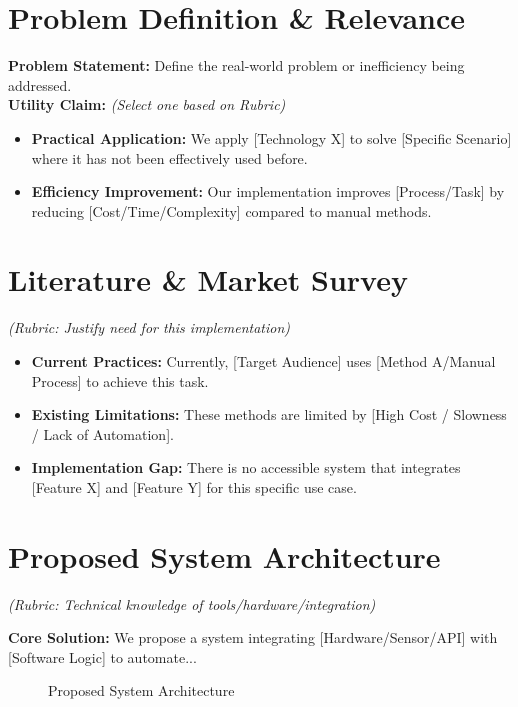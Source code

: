 \documentclass[11pt, a4paper]{article}
\begin{document}

\section{Problem Definition \& Relevance}
\textbf{Problem Statement:} Define the real-world problem or inefficiency being addressed. \\
\textbf{Utility Claim:} \textit{(Select one based on Rubric)}
\begin{itemize}[noitemsep, topsep=0pt]
    \item \textbf{Practical Application:} We apply [Technology X] to solve [Specific Scenario] where it has not been effectively used before.
    \item \textbf{Efficiency Improvement:} Our implementation improves [Process/Task] by reducing [Cost/Time/Complexity] compared to manual methods.
\end{itemize}

\section{Literature \& Market Survey}
\textit{(Rubric: Justify need for this implementation)}
\begin{itemize}[noitemsep, topsep=0pt]
    \item \textbf{Current Practices:} Currently, [Target Audience] uses [Method A/Manual Process] to achieve this task.
    \item \textbf{Existing Limitations:} These methods are limited by [High Cost / Slowness / Lack of Automation].
    \item \textbf{Implementation Gap:} There is no accessible system that integrates [Feature X] and [Feature Y] for this specific use case.
\end{itemize}

\section{Proposed System Architecture}
\textit{(Rubric: Technical knowledge of tools/hardware/integration)}

\textbf{Core Solution:} We propose a system integrating [Hardware/Sensor/API] with [Software Logic] to automate...

\begin{figure}[H]
    \centering
    \caption{Proposed System Architecture}
\end{figure}
\end{document}
